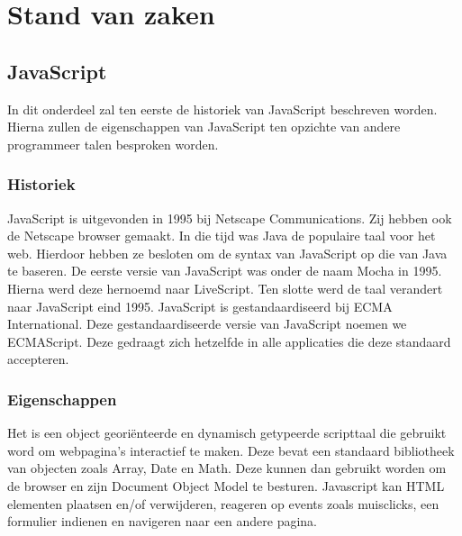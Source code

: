 \chapter{Stand van zaken}
\label{ch:stand-van-zaken}



\section{JavaScript}
\label{sec:JavaScript}

In dit onderdeel zal ten eerste de historiek van JavaScript beschreven worden. Hierna zullen de eigenschappen van JavaScript ten opzichte van andere programmeer talen besproken worden. 

\subsection{Historiek}
\label{sec:JavaScript_Historiek}

JavaScript is uitgevonden in 1995 bij Netscape Communications. Zij hebben ook de Netscape browser gemaakt. In die tijd was Java de populaire taal voor het web. Hierdoor hebben ze besloten om de syntax van JavaScript op die van Java te baseren. De eerste versie van JavaScript was onder de naam Mocha in 1995. Hierna werd deze hernoemd naar LiveScript. Ten slotte werd de taal verandert naar JavaScript eind 1995.
JavaScript is gestandaardiseerd bij ECMA International. Deze gestandaardiseerde versie van JavaScript noemen we ECMAScript. Deze gedraagt zich hetzelfde in alle applicaties die deze standaard accepteren.

\subsection{Eigenschappen}
\label{sec:JavaScript_Eigenschappen}

Het is een object georiënteerde en dynamisch getypeerde scripttaal die gebruikt word om webpagina’s interactief te maken. Deze bevat een standaard bibliotheek van objecten zoals Array, Date en Math. Deze kunnen dan gebruikt worden om de browser en zijn Document Object Model te besturen. Javascript kan HTML elementen plaatsen en/of verwijderen, reageren op events zoals muisclicks, een formulier indienen en navigeren naar een andere pagina.

